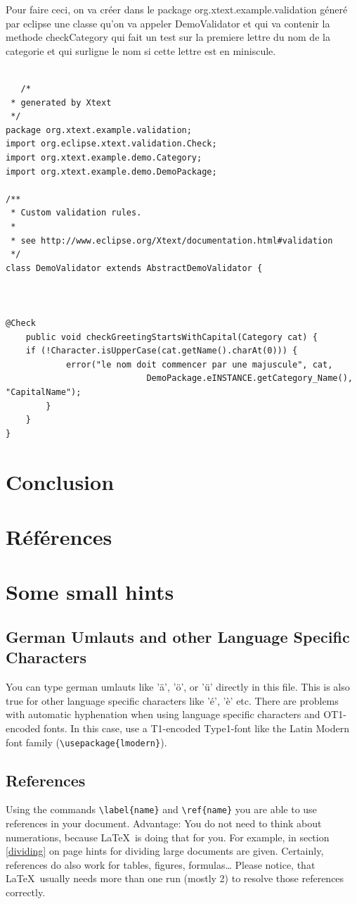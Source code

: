 \documentclass{article}
\begin{document}
Pour faire ceci, on va créer dans le package org.xtext.example.validation géneré par eclipse une classe qu'on va appeler DemoValidator et qui va contenir la methode checkCategory qui fait un test sur la premiere lettre du nom de la categorie et qui surligne le nom si cette lettre est en miniscule.


\begin{verbatim}

   /*
 * generated by Xtext
 */
package org.xtext.example.validation;
import org.eclipse.xtext.validation.Check;
import org.xtext.example.demo.Category;
import org.xtext.example.demo.DemoPackage;

/**
 * Custom validation rules. 
 *
 * see http://www.eclipse.org/Xtext/documentation.html#validation
 */
class DemoValidator extends AbstractDemoValidator {



@Check
	public void checkGreetingStartsWithCapital(Category cat) {
	if (!Character.isUpperCase(cat.getName().charAt(0))) {
			error("le nom doit commencer par une majuscule", cat,
							DemoPackage.eINSTANCE.getCategory_Name(), "CapitalName");
		}
	}
}

\end{verbatim}

\newpage


\section{Conclusion}
\label{hints}

\section{Références}
\label{hints}
\section{Some small hints}
\label{hints}
\subsection{German Umlauts and other Language Specific Characters}
\label{umlauts}
You can type german umlauts like 'ä', 'ö', or 'ü' directly in this file.
This is also true for other language specific characters like 'é', 'è' etc.
There are problems with automatic hyphenation when using language
specific characters and OT1-encoded fonts. In this case, use a
T1-encoded Type1-font like the Latin Modern font family (\verb#\usepackage{lmodern}#).
\subsection{References}
\label{references}
Using the commands \verb#\label{name}# and \verb#\ref{name}# you are able
to use references in your document. Advantage: You do not need to think
about numerations, because \LaTeX\ is doing that for you.
For example, in section \ref{dividing} on page \pageref{dividing} hints for
dividing large documents are given.
Certainly, references do also work for tables, figures, formulas\ldots
Please notice, that \LaTeX\ usually needs more than one run (mostly 2) to
resolve those references correctly.
\end{document}
